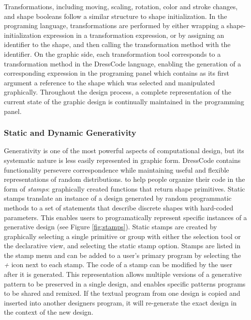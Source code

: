 \documentclass{sigchi}
\begin{document}
Transformations, including moving, scaling, rotation, color and stroke changes, and shape booleans follow a similar structure to shape initialization. In the programing language, transformations are performed by either wrapping a shape-initialization expression in a transformation expression, or by assigning an identifier to the shape, and then calling the transformation method with the identifier. On the graphic side, each transformation tool corresponds to a transformation method in the DressCode language, enabling the generation of a corresponding expression in the programing panel which contains as its first argument a reference to the shape which was selected and manipulated graphically. Throughout the design process, a complete representation of the current state of the graphic design is continually maintained in the programming panel.

\subsubsection{Static and Dynamic Generativity}
Generativity is one of the most powerful aspects of computational design, but its systematic nature is less easily represented in graphic form. DressCode contains functionality persevere correspondence while maintaining useful and flexible representations of random distributions. to help people organize their code in the form of \textit{stamps}: graphically created functions that return shape primitives. Static stamps translate an instance of a design generated by random programmatic methods to a set of statements that describe discrete shapes with hard-coded parameters. This enables users to programatically represent specific instances of a generative design (see Figure \ref{fig:stamps}). Static stamps are created by graphically selecting a single primitive or group with either the selection tool or the declarative view, and selecting the static stamp option. Stamps are listed in the stamp menu and can be added to a user's primary program by selecting the \textit{+} icon next to each stamp. The code of a stamp can be modified by the user after it is generated. This representation allows multiple versions of a generative pattern to be preserved in a single design, and enables specific patterns programs to be shared and remixed. If the textual program from one design is copied and inserted into another designers program, it will re-generate the exact design in the context of the new design.
\end{document}
